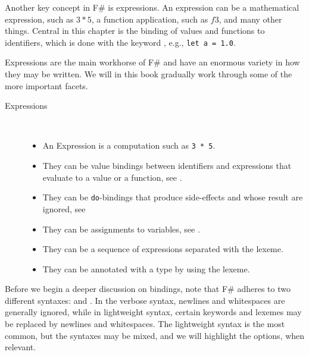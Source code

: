 \documentclass[fsharpnotes.tex]{subfiles}
\begin{document}
Another key concept in F\# is expressions. An expression can be a mathematical expression, such as $3*5$, a function application, such as $f 3$, and many other things. Central in this chapter is the binding of values and functions to identifiers, which is done with the keyword , e.g., \lstinline!let a = 1.0!.

Expressions are the main workhorse of F\# and have an enormous variety in how they may be written. We will in this book gradually work through some of the more important facets.
\begin{description} 
\item[Expressions]~\\[-5mm]
  \begin{itemize}
  \item An Expression is a computation such as \lstinline{3 * 5}.
  \item They can be value bindings between identifiers and expressions that evaluate to a value or a function, see .
  \item They can be \lstinline{do}-bindings that produce side-effects and whose result are ignored, see  
  \item They can be assignments to variables, see .
  \item They can be a sequence of expressions separated with the \idx[;@\lstinline{;}]{\lexeme{;}} lexeme.
  \item They can be annotated with a type by using the \idx[:@\lstinline{:}]{\lexeme{:}} lexeme.
  \end{itemize}
\end{description}

Before we begin a deeper discussion on bindings, note that F\#  adheres to two different syntaxes:  and . In the verbose syntax, newlines and whitespaces are generally ignored, while in lightweight syntax, certain keywords and lexemes may be replaced by newlines and whitespaces. The lightweight syntax is the most common, but the syntaxes may be mixed, and we will highlight the options, when relevant.
\end{document}
